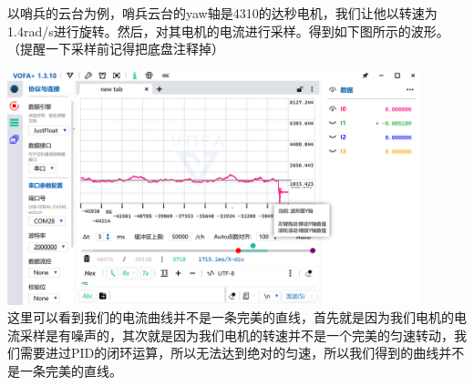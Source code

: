 \documentclass[UTF8,a4paper,12pt]{ctexart}
\begin{document}
        \begin{flushleft}
          以哨兵的云台为例，哨兵云台的yaw轴是4310的达秒电机，我们让他以转速为1.4rad/s进行旋转。然后，对其电机的电流进行采样。得到如下图所示的波形。（提醒一下采样前记得把底盘注释掉）
           \par \includegraphics[width=12cm]{picture/yaw_current_compensation.png}\\
             {\scriptsize 这里可以看到我们的电流曲线并不是一条完美的直线，首先就是因为我们电机的电流采样是有噪声的，其次就是因为我们电机的转速并不是一个完美的匀速转动，我们需要进过PID的闭环运算，所以无法达到绝对的匀速，所以我们得到的曲线并不是一条完美的直线。
            }
        \end{flushleft}
        
\end{document}
